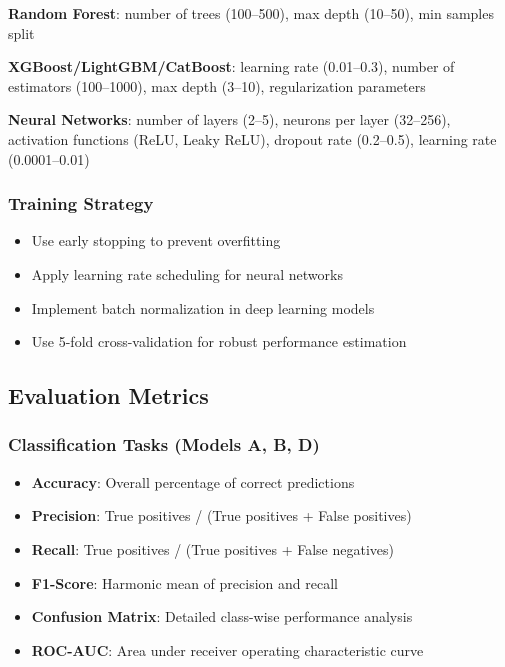 \documentclass[conference]{IEEEtran}
\begin{document}
\textbf{Random Forest}: number of trees (100--500), max depth (10--50), min samples split

\textbf{XGBoost/LightGBM/CatBoost}: learning rate (0.01--0.3), number of estimators (100--1000), max depth (3--10), regularization parameters

\textbf{Neural Networks}: number of layers (2--5), neurons per layer (32--256), activation functions (ReLU, Leaky ReLU), dropout rate (0.2--0.5), learning rate (0.0001--0.01)

\subsubsection{Training Strategy}
\begin{itemize}
\item Use early stopping to prevent overfitting
\item Apply learning rate scheduling for neural networks
\item Implement batch normalization in deep learning models
\item Use 5-fold cross-validation for robust performance estimation
\end{itemize}

\subsection{Evaluation Metrics}

\subsubsection{Classification Tasks (Models A, B, D)}
\begin{itemize}
\item \textbf{Accuracy}: Overall percentage of correct predictions
\item \textbf{Precision}: True positives / (True positives + False positives)
\item \textbf{Recall}: True positives / (True positives + False negatives)
\item \textbf{F1-Score}: Harmonic mean of precision and recall
\item \textbf{Confusion Matrix}: Detailed class-wise performance analysis
\item \textbf{ROC-AUC}: Area under receiver operating characteristic curve
\end{itemize}
\end{document}
